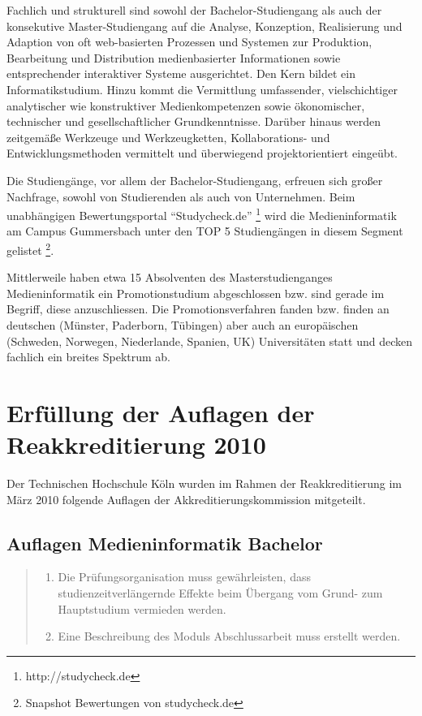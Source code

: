 Fachlich und strukturell sind sowohl der Bachelor-Studiengang als auch
der konsekutive Master-Studiengang auf die Analyse, Konzeption,
Realisierung und Adaption von oft web-basierten Prozessen und Systemen
zur Produktion, Bearbeitung und Distribution medienbasierter
Informationen sowie entsprechender interaktiver Systeme ausgerichtet.
Den Kern bildet ein Informatikstudium. Hinzu kommt die Vermittlung
umfassender, vielschichtiger analytischer wie konstruktiver
Medienkompetenzen sowie ökonomischer, technischer und gesellschaftlicher
Grundkenntnisse. Darüber hinaus werden zeitgemäße Werkzeuge und
Werkzeugketten, Kollaborations- und Entwicklungsmethoden vermittelt und
überwiegend projektorientiert eingeübt.

Die Studiengänge, vor allem der Bachelor-Studiengang, erfreuen sich
großer Nachfrage, sowohl von Studierenden als auch von Unternehmen. Beim
unabhängigen Bewertungsportal ``Studycheck.de'' \footnote{http://studycheck.de}
wird die Medieninformatik am Campus Gummersbach unter den TOP 5
Studiengängen in diesem Segment gelistet \footnote{Snapshot Bewertungen
  von studycheck.de}.

Mittlerweile haben etwa 15 Absolventen des Masterstudienganges
Medieninformatik ein Promotionstudium abgeschlossen bzw. sind gerade im
Begriff, diese anzuschliessen. Die Promotionsverfahren fanden bzw.
finden an deutschen (Münster, Paderborn, Tübingen) aber auch an
europäischen (Schweden, Norwegen, Niederlande, Spanien, UK)
Universitäten statt und decken fachlich ein breites Spektrum ab.

\section{Erfüllung der Auflagen der Reakkreditierung
2010}\label{erfuxfcllung-der-auflagen-der-reakkreditierung-2010}

Der Technischen Hochschule Köln wurden im Rahmen der Reakkreditierung im
März 2010 folgende Auflagen der Akkreditierungskommission mitgeteilt.

\subsection{Auflagen Medieninformatik
Bachelor}\label{auflagen-medieninformatik-bachelor}

\begin{quote}
\begin{enumerate}
\def\labelenumi{\arabic{enumi}.}
\tightlist
\item
  Die Prüfungsorganisation muss gewährleisten, dass
  studienzeitverlängernde Effekte beim Übergang vom Grund- zum
  Hauptstudium vermieden werden.
\item
  Eine Beschreibung des Moduls Abschlussarbeit muss erstellt werden.
\end{enumerate}
\end{quote}

